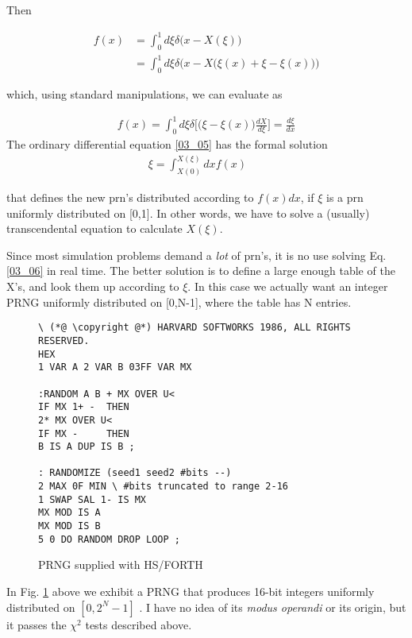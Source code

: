 Then

\begin{align}
    f(x) &= \int_{0}^{1}d\xi\delta \Big(x-X(\xi)\Big)\nonumber \\
    &= \int_{0}^{1}d\xi\delta \Big(x-X\Big(\xi(x)+\xi-\xi(x)\Big)\Big)
\end{align}

which, using standard manipulations, we can evaluate as

\begin{eqnarray} 
    f(x)=\int_{0}^{1}d\xi\delta \Big[\Big(\xi-\xi(x)\Big)\frac{dX}{d\xi}\Big]=\frac{d\xi}{dx} \label{03_05}
\end{eqnarray} 
The ordinary differential equation \ref{03_05} has the formal solution
\begin{eqnarray} 
    \xi=\int_{X(0)}^{X(\xi)}dx f(x) \label{03_06} &&
\end{eqnarray} 

that defines the new prn's distributed according to $f(x)dx$, if $\xi$ is a
prn uniformly distributed on [0,1]. In other words, we have to
solve a (usually) transcendental equation to calculate $X(\xi)$.

Since most simulation problems demand a \textit{lot} of prn's, it is no use
solving Eq. \ref{03_06} in real time. The better solution is to define a large
enough table of the X's, and look them up according to $\xi$. In this
case we actually want an integer PRNG uniformly distributed on
[0,N-1], where the table has N entries.

\begin{figure}[H]
    \label{fig:03_03}
    \begin{mdframed}
        \begin{lstlisting}
\ (*@ \copyright @*) HARVARD SOFTWORKS 1986, ALL RIGHTS RESERVED.
HEX
1 VAR A 2 VAR B 03FF VAR MX

:RANDOM A B + MX OVER U<
IF MX 1+ -  THEN
2* MX OVER U<
IF MX -     THEN
B IS A DUP IS B ;

: RANDOMIZE (seed1 seed2 #bits --)
2 MAX 0F MIN \ #bits truncated to range 2-16
1 SWAP SAL 1- IS MX
MX MOD IS A
MX MOD IS B
5 0 DO RANDOM DROP LOOP ;
        \end{lstlisting}
    \end{mdframed}
    \caption{PRNG supplied with HS/FORTH}
\end{figure}

In Fig. \ref{fig:03_03}  above we exhibit a PRNG that produces 16-bit integers
uniformly distributed on $[0, 2^N-1]$ . I have no idea of its \textit{modus
operandi} or its origin, but it passes the $\chi^2$ tests described above.

